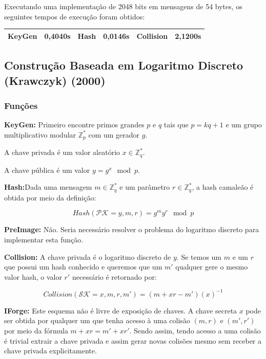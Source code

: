 \documentclass[a4paper]{article}
\begin{document}
Executando uma implementação de 2048 bits em mensagens de 54 bytes, os
seguintes tempos de execução foram obtidos:

\begin{center}
\begin{tabular}{|c|c|c|c|c|c|}
  \hline
  KeyGen & 0,4040s & Hash & 0,0146s & Collision & 2,1200s\\
  \hline
\end{tabular}
\end{center}

\subsection{Construção Baseada em Logaritmo Discreto (Krawczyk) (2000)
  \cite{krawczyk}}

\subsubsection{Funções}

\textbf{KeyGen: }Primeiro encontre primos grandes $p$ e $q$ tais que
$p = kq+1$ e um grupo multiplicativo modular $\mathbb{Z}^{*}_p$ com um
gerador $g$.

A chave privada é um valor aleatório $x \in \mathbb{Z}^{*}_q$.

A chave pública é um valor $y = g^x \mod p$.

\textbf{Hash:}Dada uma mensagem $m \in \mathbb{Z}^{*}_q$ e um
parâmetro $r\in \mathbb{Z}^{*}_q$, a hash camaleão é obtida por meio
da definição:

$$
Hash(\mathcal{PK}=y, m, r) = g^my^r \mod p
$$

\textbf{PreImage:} Não. Seria necessário resolver o problema do
logaritmo discreto para implementar esta função.

\textbf{Collision:} A chave privada é o logaritmo discreto de $y$. Se
temos um $m$ e um $r$ que possui um hash conhecido e queremos que um
$m'$ qualquer gere o mesmo valor hash, o valor $r'$ necessário é
retornado por:

$$
Collision(\mathcal{SK}=x, m, r, m') = (m+xr-m')(x)^{-1}
$$

\textbf{IForge:} Este esquema não é livre de exposição de chaves. A
chave secreta $x$ pode ser obtida por qualquer um que tenha acesso à
uma colisão $(m, r)$ e $(m', r')$ por meio da fórmula $m+xr =
m'+xr'$. Sendo assim, tendo acesso a uma colisão é trivial extrair a
chave privada e assim gerar novas colisões mesmo sem receber a chave
privada explicitamente.
\end{document}
